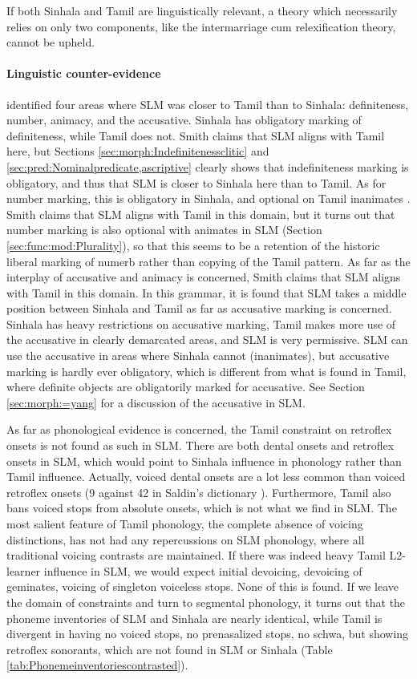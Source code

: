 If both Sinhala and Tamil are linguistically relevant, a theory which necessarily relies on only two components, like the intermarriage cum relexification theory, cannot be upheld.


\paragraph{Linguistic counter-evidence}
\citet{SmithRH} identified four areas where SLM was closer to Tamil than to Sinhala: definiteness, number, animacy, and the accusative. Sinhala has obligatory marking of definiteness, while Tamil does not. Smith claims that SLM aligns with Tamil here, but Sections \ref{sec:morph:Indefinitenessclitic} and \ref{sec:pred:Nominalpredicate,ascriptive} clearly shows that indefiniteness marking is obligatory, and thus that SLM is closer to Sinhala here than to Tamil. As for number marking, this is obligatory in Sinhala, and optional on  Tamil inanimates \citep[20]{Lehmann1989}. Smith claims that SLM aligns with Tamil in this domain, but it turns out that number marking is also optional with animates in SLM (Section \ref{sec:func:mod:Plurality}), so that this seems to be a retention of the historic liberal marking of numerb rather than copying of the Tamil pattern. As far as the interplay of accusative and animacy is concerned, Smith claims that SLM aligns with Tamil in this domain. In this grammar, it is found that SLM takes a middle position between Sinhala and Tamil as far as accusative marking is concerned. Sinhala has heavy restrictions on accusative marking, Tamil makes more use of the accusative in clearly demarcated areas, and SLM is very permissive. SLM can use the accusative in areas where Sinhala cannot (inanimates), but accusative marking is hardly ever obligatory, which is different from what is found in Tamil, where definite objects are obligatorily marked for accusative. See Section \ref{sec:morph:=yang} for a discussion of the accusative in SLM.

As far as phonological evidence is concerned, the Tamil constraint on retroflex onsets is not found as such in SLM. There are both dental onsets  and retroflex onsets  in SLM, which would point  to Sinhala influence in phonology rather than Tamil influence. Actually, voiced dental onsets are a lot less common than voiced retroflex onsets (9 against 42 in Saldin's dictionary \citep{Saldin2007Dico}). Furthermore,  Tamil also bans voiced stops from absolute onsets, which is not what we find in SLM. The most salient feature of Tamil phonology, the complete absence of voicing distinctions, has not had any repercussions on SLM phonology, where all traditional voicing contrasts are maintained. If there was indeed heavy Tamil L2-learner influence in SLM, we would expect initial devoicing, devoicing of geminates, voicing of singleton voiceless stops. None of this is found. If we leave the domain of constraints and turn to segmental phonology, it turns out that the phoneme inventories of SLM and Sinhala are nearly identical, while Tamil is divergent in having no voiced stops, no prenasalized stops, no schwa, but showing retroflex sonorants, which are not found in SLM or Sinhala (Table \ref{tab:Phonemeinventoriescontrasted}).

